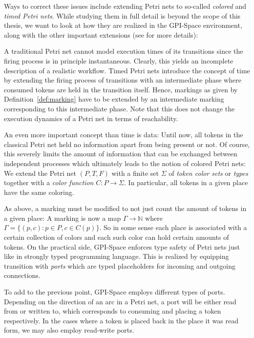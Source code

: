 \documentclass[
  paper=a4,
  titlepage,
  bibliography=totoc,
  pagesize=pdftex
]{scrartcl}
\numberwithin{figure}{section}
\numberwithin{equation}{section}
\numberwithin{table}{section}
\newcommand*\setN{\mathds{N}}
\theoremstyle{definition}
\numberwithin{definition}{section}
\begin{document}
Ways to correct these issues include extending Petri nets to so-called \emph{colored} and
\emph{timed Petri nets}. While studying them in full detail is beyond the scope of this
thesis, we want to look at how they are realized in the GPI-Space environment, along with
the other important extensions (see \cite[Section~3.2.2]{towardsParallel} for more
details):

A traditional Petri net cannot model execution times of its transitions since the firing
process is in principle instantaneous. Clearly, this yields an incomplete description of
a realistic workflow. Timed Petri nets introduce the concept of time by extending the
firing process of transitions with an intermediate phase where consumed tokens are held in
the transition itself. Hence, markings as given by Definition~\ref{def:marking} have to be
extended by an intermediate marking corresponding to this intermediate phase. Note that
this does not change the execution dynamics of a Petri net in terms of reachability.

An even more important concept than time is data: Until now, all tokens in the classical
Petri net held no information apart from being present or not. Of course, this severely
limits the amount of information that can be exchanged between independent processes which
ultimately leads to the notion of colored Petri nets: We extend the Petri net $(P,T,F)$
with a finite set $\Sigma$ of \emph{token color sets} or \emph{types} together with a
\emph{color function} $C:P\to\Sigma$. In particular, all tokens in a given place have the
same coloring.

As above, a marking must be modified to not just count the amount of tokens in a given
place: A marking is now a map $\Gamma \to \setN$ where $\Gamma = \{ (p,c) : p \in P, c \in
C(p) \}$. So in some sense each place is associated with a certain collection of colors
and each such color can hold certain amounts of tokens. On the practical side, GPI-Space
enforces type safety of Petri nets just like in strongly typed programming language. This
is realized by equipping transition with \emph{ports} which are typed placeholders for
incoming and outgoing connections.

To add to the previous point, GPI-Space employs different types of ports. Depending on the
direction of an arc in a Petri net, a port will be either read from or written to, which
corresponds to consuming and placing a token respectively. In the cases where a token is
placed back in the place it was read form, we may also employ read-write ports.
\end{document}
